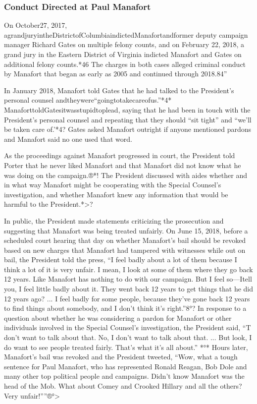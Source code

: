 \subsubsection{Conduct Directed at Paul Manafort}

On October27, 2017, agrandjuryintheDistrictofColumbiaindictedManafortandformer deputy campaign manager Richard Gates on multiple felony counts, and on February 22, 2018, a grand jury in the Eastern District of Virginia indicted Manafort and Gates on additional felony counts.*46 The charges in both cases alleged criminal conduct by Manafort that began as early as 2005 and continued through 2018.84”

In January 2018, Manafort told Gates that he had talked to the President's personal counsel andtheywere“goingtotakecareofus.”*4* ManaforttoldGatesitwasstupidtoplead, saying that he had been in touch with the President's personal counsel and repeating that they should “sit tight” and “we'll be taken care of.'*4? Gates asked Manafort outright if anyone mentioned pardons and Manafort said no one used that word.

As the proceedings against Manafort progressed in court, the President told Porter that he never liked Manafort and that Manafort did not know what he was doing on the campaign.®*! The President discussed with aides whether and in what way Manafort might be cooperating with the Special Counsel's investigation, and whether Manafort knew any information that would be harmful to the President.*>?

In public, the President made statements criticizing the prosecution and suggesting that Manafort was being treated unfairly. On June 15, 2018, before a scheduled court hearing that day on whether Manafort's bail should be revoked based on new charges that Manafort had tampered with witnesses while out on bail, the President told the press, “I feel badly about a lot of them because I think a lot of it is very unfair. I mean, I look at some of them where they go back 12 years. Like Manafort has nothing to do with our campaign. But I feel so—Itell you, I feel little badly about it. They went back 12 years to get things that he did 12 years ago? ... I feel badly for some people, because they've gone back 12 years to find things about somebody, and I don't think it's right.”8°? In response to a question about whether he was considering a pardon for Manafort or other individuals involved in the Special Counsel's investigation, the President said, “T don't want to talk about that. No, I don't want to talk about that. ... But look, I do want to see people treated fairly. That's what it's all about.” *°* Hours later, Manafort's bail was revoked and the President tweeted, “Wow, what a tough sentence for Paul Manafort, who has represented Ronald Reagan, Bob Dole and many other top political people and campaigns. Didn't know Manafort was the head of the Mob. What about Comey and Crooked Hillary and all the others? Very unfair!””®°>

